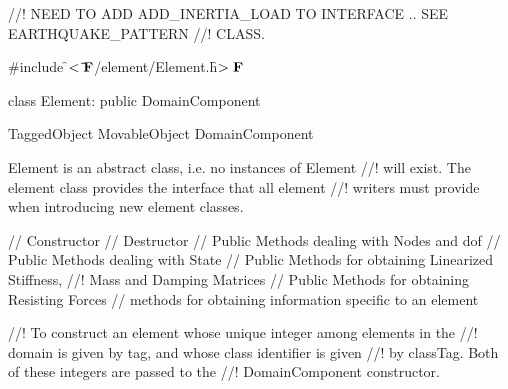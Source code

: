 
//! NEED TO ADD ADD\_INERTIA\_LOAD TO INTERFACE .. SEE EARTHQUAKE\_PATTERN
//! CLASS.

\indent \#include \f$<\tilde{ }{\bf F}$/element/Element.h\f$>{\bf F}$

\indent class Element: public DomainComponent

\indent TaggedObject
\indent MovableObject
\indent\indent DomainComponent
\indent\indent{}

\indent Element is an abstract class, i.e. no instances of Element
//! will exist. The element class provides the interface that all element
//! writers must provide when introducing new element classes.


\indent // Constructor
\indent // Destructor
\indent // Public Methods dealing with Nodes and dof
\indent // Public Methods dealing with State
\indent // Public Methods for obtaining Linearized Stiffness,
//! Mass and Damping Matrices
\indent // Public Methods for obtaining Resisting Forces
\indent // methods for obtaining information specific to an element

//! To construct an element whose unique integer among elements in the
//! domain is given by \p tag, and whose class identifier is given
//! by \p classTag. Both of these integers are passed to the
//! DomainComponent constructor.

